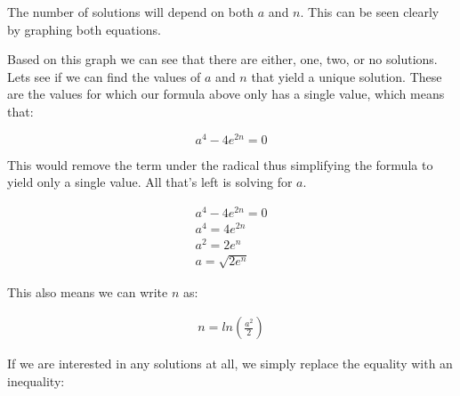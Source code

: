 \documentclass{report}
\begin{document}
\begin{description}
\begin{mdframed}
            \vspace{10pt}

            The number of solutions will depend on both $a$
            and $n$. This can be seen clearly by graphing both
            equations.

            \begin{center}
            \end{center}

            Based on this graph we can see that there are either,
            one, two, or no solutions. Lets see if we can find the
            values of $a$ and $n$ that yield a unique solution. These
            are the values for which our formula above only has a
            single value, which means that:

            \begin{displaymath}
                a^4 - 4e^{2n} = 0
            \end{displaymath}

            This would remove the term under the radical thus
            simplifying the formula to yield only a single
            value. All that's left is solving for $a$.

            \begin{gather}
                a^4 - 4e^{2n} = 0\\ 
                a^4 = 4e^{2n}\\
                a^2 = 2e^n\\
                a = \sqrt{2e^n}
            \end{gather}

            This also means we can write $n$ as:

            \begin{gather}
                n = ln(\frac{a^2}{2})
            \end{gather}

            If we are interested in any solutions at all,
            we simply replace the equality with an inequality:


\end{mdframed}
\end{description}
\end{document}
